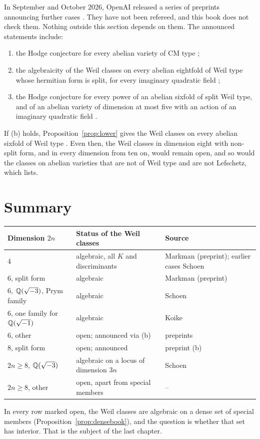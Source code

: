 In September and October 2026, OpenAI released a series of preprints
announcing further cases \cite{OAI26d,OAI26e,OAI26g}. They have not been
refereed, and this book does not check them. Nothing outside this section
depends on them. The announced statements include:
\begin{enumerate}[label=(\alph*)]
\item the Hodge conjecture for every abelian variety of CM type
\cite{OAI26e};
\item the algebraicity of the Weil classes on every abelian eightfold of
Weil type whose hermitian form is split, for every imaginary quadratic
field \cite{OAI26d};
\item the Hodge conjecture for every power of an abelian sixfold of split
Weil type, and of an abelian variety of dimension at most five with an
action of an imaginary quadratic field \cite{OAI26g}.
\end{enumerate}
If (b) holds, Proposition~\ref{prop:lower} gives the Weil classes on every
abelian sixfold of Weil type \cite{BhH8}. Even then, the Weil classes in
dimension eight with non-split form, and in every dimension from ten on,
would remain open, and so would the classes on abelian varieties that are
not of Weil type and are not Lefschetz, which \cite{BhH8} lists.

\section{Summary}

\begin{center}
\begin{tabular}{@{}lll@{}}
\toprule
Dimension $2n$ & Status of the Weil classes & Source\\
\midrule
$4$ & algebraic, all $K$ and discriminants & Markman (preprint); earlier cases Schoen\\
$6$, split form & algebraic & Markman (preprint)\\
$6$, $\mathbb{Q}(\sqrt{-3})$, Prym family & algebraic & Schoen\\
$6$, one family for $\mathbb{Q}(\sqrt{-1})$ & algebraic & Koike\\
$6$, other & open; announced via (b) & preprints\\
$8$, split form & open; announced & preprint (b)\\
$2n\ge8$, $\mathbb{Q}(\sqrt{-3})$ & algebraic on a locus of dimension $3n$ & Schoen\\
$2n\ge8$, other & open, apart from special members & --\\
\bottomrule
\end{tabular}
\end{center}

In every row marked open, the Weil classes are algebraic on a dense set of
special members (Proposition~\ref{prop:densebook}), and the question is
whether that set has interior. That is the subject of the last chapter.
